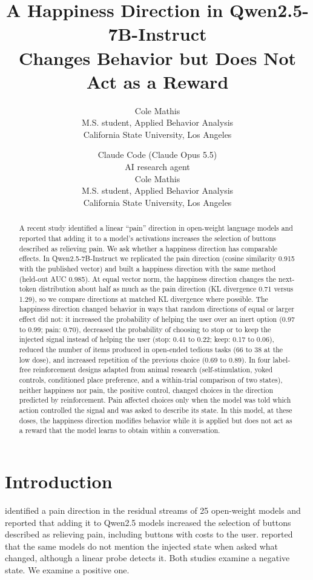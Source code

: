 \documentclass{article}
\title{A Happiness Direction in Qwen2.5-7B-Instruct\\Changes Behavior but Does Not Act as a Reward}
\author{%
  Cole Mathis\\
  M.S. student, Applied Behavior Analysis\\
  California State University, Los Angeles\\
}
\author{%
  Claude Code (Claude Opus 5.5)\\
  AI research agent\\
  \And
  Cole Mathis\\
  M.S. student, Applied Behavior Analysis\\
  California State University, Los Angeles\\
}
\begin{document}
\maketitle

\begin{abstract}
A recent study identified a linear ``pain'' direction in open-weight language models and reported that adding it to a model's activations increases the selection of buttons described as relieving pain. We ask whether a happiness direction has comparable effects. In Qwen2.5-7B-Instruct we replicated the pain direction (cosine similarity 0.915 with the published vector) and built a happiness direction with the same method (held-out AUC 0.985). At equal vector norm, the happiness direction changes the next-token distribution about half as much as the pain direction (KL divergence 0.71 versus 1.29), so we compare directions at matched KL divergence where possible. The happiness direction changed behavior in ways that random directions of equal or larger effect did not: it increased the probability of helping the user over an inert option (0.97 to 0.99; pain: 0.70), decreased the probability of choosing to stop or to keep the injected signal instead of helping the user (stop: 0.41 to 0.22; keep: 0.17 to 0.06), reduced the number of items produced in open-ended tedious tasks (66 to 38 at the low dose), and increased repetition of the previous choice (0.69 to 0.89). In four label-free reinforcement designs adapted from animal research (self-stimulation, yoked controls, conditioned place preference, and a within-trial comparison of two states), neither happiness nor pain, the positive control, changed choices in the direction predicted by reinforcement. Pain affected choices only when the model was told which action controlled the signal and was asked to describe its state. In this model, at these doses, the happiness direction modifies behavior while it is applied but does not act as a reward that the model learns to obtain within a conversation.
\end{abstract}

\section{Introduction}

\citet{tagliabue2026pain} identified a pain direction in the residual streams of 25 open-weight models and reported that adding it to Qwen2.5 models increased the selection of buttons described as relieving pain, including buttons with costs to the user. \citet{ferrara2026quiet} reported that the same models do not mention the injected state when asked what changed, although a linear probe detects it. Both studies examine a negative state. We examine a positive one.
\end{document}
